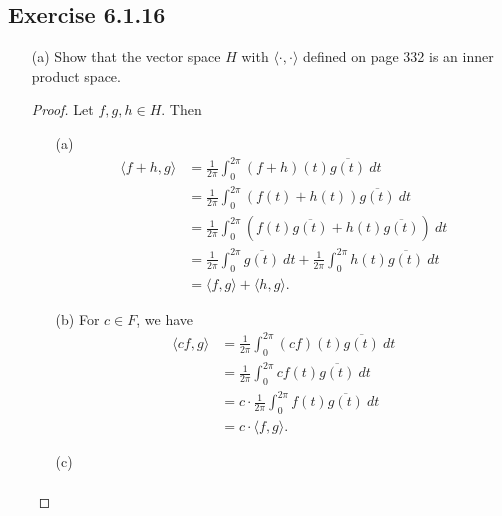 \subsection*{Exercise 6.1.16} 
\begin{enumerate}
    \item[(a)] Show that the vector space \( H  \) with \( \langle  \cdot  ,  \cdot  \rangle \) defined on page 332 is an inner product space.
        \begin{proof}
            Let \( f,g,h \in H  \). Then
        \begin{enumerate}
            \item[(a)] 
                \begin{align*}
                    \langle  f + h  , g  \rangle &= \frac{ 1  }{  2 \pi  } \int_{ 0  }^{  2 \pi  } (f + h)(t) \overline{g(t)} \ dt  \\
                                                 &= \frac{ 1 }{  2 \pi }  \int_{ 0 }^{ 2 \pi  } (f(t) + h(t)) \overline{g(t)} \ dt \\
                                                 &= \frac{ 1 }{ 2 \pi  }  \int_{ 0 }^{  2\pi  } (f(t)\overline{g(t)} + h(t) \overline{g(t)}) \ dt \\
                                                 &= \frac{ 1 }{ 2 \pi  } \int_{ 0 }^{ 2 \pi  } \overline{g(t)} \ dt + \frac{ 1 }{ 2 \pi  }  \int_{ 0 }^{  2 \pi } h(t) \overline{g(t)}  \ dt \\
                                                 &= \langle f , g \rangle + \langle h   , g \rangle.
                \end{align*}
            \item[(b)] For \( c \in F  \), we have 
                \begin{align*}
                    \langle cf , g \rangle &= \frac{ 1 }{ 2\pi } \int_{ 0 }^{ 2 \pi } (cf)(t) \overline{g(t)} \ dt \\
                                           &= \frac{ 1  }{ 2 \pi  }  \int_{ 0 }^{ 2 \pi }  c f(t) \overline{g(t)} \ dt \\
                                           &= c \cdot  \frac{ 1 }{ 2 \pi }  \int_{ 0 }^{  2\pi } f(t) \overline{g(t)}   \ dt \\
                                           &=  c \cdot \langle f  , g \rangle.
                \end{align*}
            \item[(c)] 
                \begin{align*}

\end{align*}
\end{enumerate}
\end{proof}
\end{enumerate}

